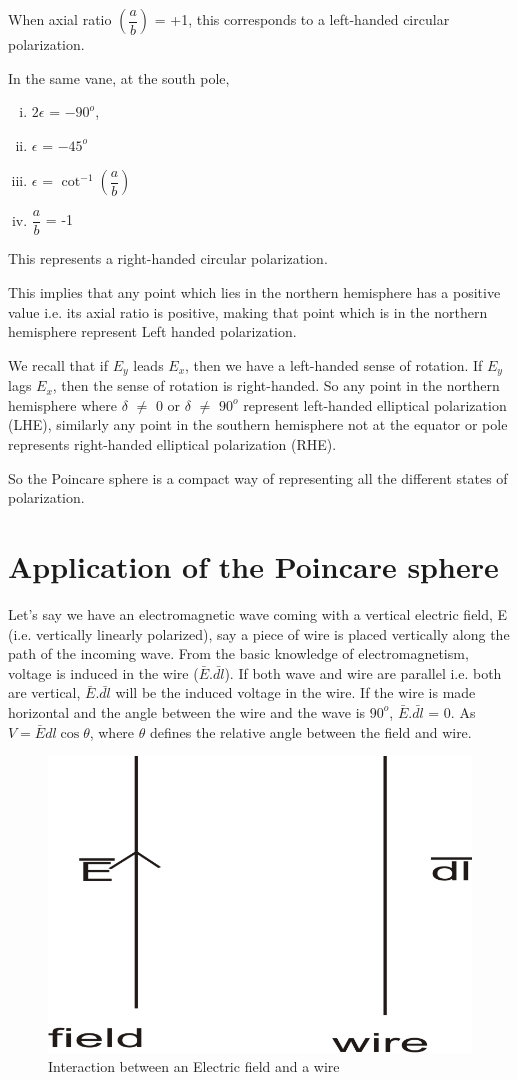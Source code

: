 When axial ratio $(\dfrac{a}{b})$ = +1, this corresponds to a left-handed circular polarization.

In the same vane, at the south pole,
\begin{enumerate}[(i)]
\item	$2\epsilon$ = $-90^{o}$, 
\item $\epsilon$ = $-45^{o}$
\item $\epsilon$ = $\cot^{-1}(\dfrac{a}{b})$
\item $\dfrac{a}{b}$ = -1
\end{enumerate}	
This represents a right-handed circular polarization.

This implies that any point which lies in the northern hemisphere has a positive value i.e. its axial ratio is positive, making that point which is in the northern hemisphere represent Left handed polarization.

We recall that if $E_{y}$ leads $E_{x}$, then we have a left-handed sense of rotation. If $E_{y}$ lags $E_{x}$, then the sense of rotation is right-handed. So any point in the northern hemisphere where $\delta$ $\neq$ 0 or $\delta$ $\neq$ $90^{o}$ represent left-handed elliptical polarization  (LHE), similarly any point in the southern hemisphere not at the equator or pole represents right-handed elliptical polarization (RHE).

So the Poincare sphere is a compact way of representing all the different states of polarization.

\section{Application of the Poincare sphere}
Let's say we have an electromagnetic wave coming with a vertical electric field, E (i.e. vertically linearly polarized), say a piece of wire is placed vertically along the path of the incoming wave. From the basic knowledge of electromagnetism, voltage is induced in the wire ($\bar{E}$.$\bar{dl}$). If both wave and wire are parallel i.e. both are vertical, $\bar{E}$.$\bar{dl}$ will be the induced voltage in the wire. If the wire is made horizontal and the angle between the wire and the wave is $90^{o}$, $\bar{E}$.$\bar{dl}$ = 0. As $ V = \bar{E}dl\cos\theta $, where $ \theta $ defines the relative angle between the field and wire.
\begin{figure}[h]
\centering
\includegraphics[width=.7\linewidth]{graphics/interact}
\caption{Interaction between an Electric field and a wire}
\label{fig:interact}
\end{figure}


